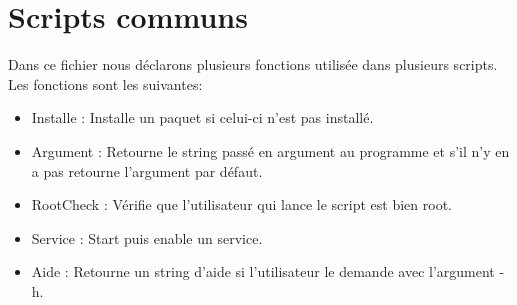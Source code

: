 \section{Scripts communs}

Dans ce fichier nous déclarons plusieurs fonctions utilisée dans plusieurs scripts. Les fonctions sont les suivantes:
\begin{itemize}
	\item Installe : Installe un paquet si celui-ci n'est pas installé.
	\item Argument : Retourne le string passé en argument au programme et s'il n'y en a pas retourne l'argument par défaut.
	\item RootCheck : Vérifie que l'utilisateur qui lance le script est bien root.
	\item Service : Start puis enable un service.
	\item Aide : Retourne un string d'aide si l'utilisateur le demande avec l'argument -h.
\end{itemize}
